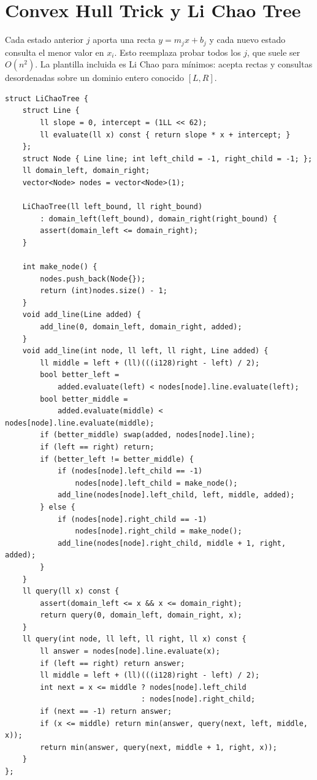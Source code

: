 \section{Convex Hull Trick y Li Chao Tree}

Cada estado anterior $j$ aporta una recta $y=m_jx+b_j$ y cada nuevo estado
consulta el menor valor en $x_i$. Esto reemplaza probar todos los $j$, que suele
ser $O(n^2)$. La plantilla incluida es Li Chao para m\'inimos: acepta rectas y
consultas desordenadas sobre un dominio entero conocido $[L,R]$.


\begin{lstlisting}[style=cpp]
struct LiChaoTree {
    struct Line {
        ll slope = 0, intercept = (1LL << 62);
        ll evaluate(ll x) const { return slope * x + intercept; }
    };
    struct Node { Line line; int left_child = -1, right_child = -1; };
    ll domain_left, domain_right;
    vector<Node> nodes = vector<Node>(1);

    LiChaoTree(ll left_bound, ll right_bound)
        : domain_left(left_bound), domain_right(right_bound) {
        assert(domain_left <= domain_right);
    }

    int make_node() {
        nodes.push_back(Node{});
        return (int)nodes.size() - 1;
    }
    void add_line(Line added) {
        add_line(0, domain_left, domain_right, added);
    }
    void add_line(int node, ll left, ll right, Line added) {
        ll middle = left + (ll)(((i128)right - left) / 2);
        bool better_left =
            added.evaluate(left) < nodes[node].line.evaluate(left);
        bool better_middle =
            added.evaluate(middle) < nodes[node].line.evaluate(middle);
        if (better_middle) swap(added, nodes[node].line);
        if (left == right) return;
        if (better_left != better_middle) {
            if (nodes[node].left_child == -1)
                nodes[node].left_child = make_node();
            add_line(nodes[node].left_child, left, middle, added);
        } else {
            if (nodes[node].right_child == -1)
                nodes[node].right_child = make_node();
            add_line(nodes[node].right_child, middle + 1, right, added);
        }
    }
    ll query(ll x) const {
        assert(domain_left <= x && x <= domain_right);
        return query(0, domain_left, domain_right, x);
    }
    ll query(int node, ll left, ll right, ll x) const {
        ll answer = nodes[node].line.evaluate(x);
        if (left == right) return answer;
        ll middle = left + (ll)(((i128)right - left) / 2);
        int next = x <= middle ? nodes[node].left_child
                               : nodes[node].right_child;
        if (next == -1) return answer;
        if (x <= middle) return min(answer, query(next, left, middle, x));
        return min(answer, query(next, middle + 1, right, x));
    }
};
\end{lstlisting}

